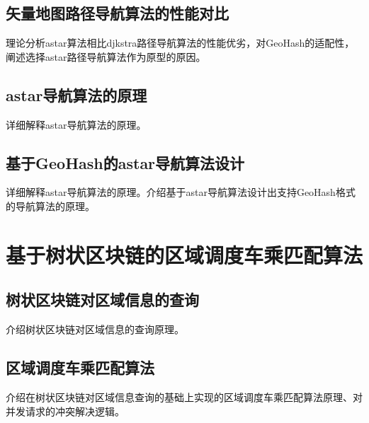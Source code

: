 \subsection{矢量地图路径导航算法的性能对比}
理论分析astar算法相比djkstra路径导航算法的性能优劣，对GeoHash的适配性，阐述选择astar路径导航算法作为原型的原因。
\subsection{astar导航算法的原理}
详细解释astar导航算法的原理。
\subsection{基于GeoHash的astar导航算法设计}
详细解释astar导航算法的原理。介绍基于astar导航算法设计出支持GeoHash格式的导航算法的原理。

\section{基于树状区块链的区域调度车乘匹配算法}
\subsection{树状区块链对区域信息的查询}
介绍树状区块链对区域信息的查询原理。
\subsection{区域调度车乘匹配算法}
介绍在树状区块链对区域信息查询的基础上实现的区域调度车乘匹配算法原理、对并发请求的冲突解决逻辑。